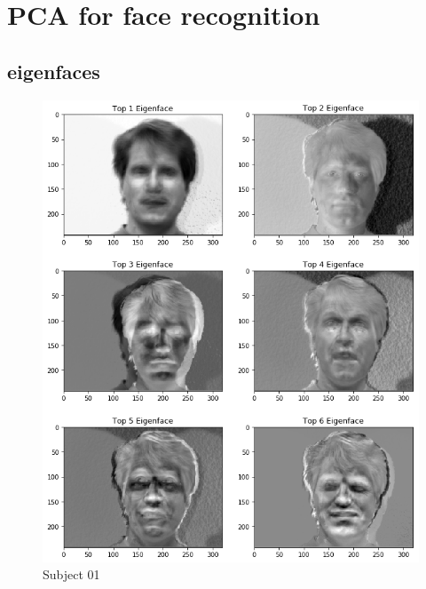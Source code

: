 \documentclass{article}
\begin{document}
\section{PCA for face recognition}
\subsection{eigenfaces}

\begin{figure}[h!]
\centering
  \caption{Subject 01}
  \includegraphics[scale = 0.36]{subject01.png}
\end{figure}
\end{document}
